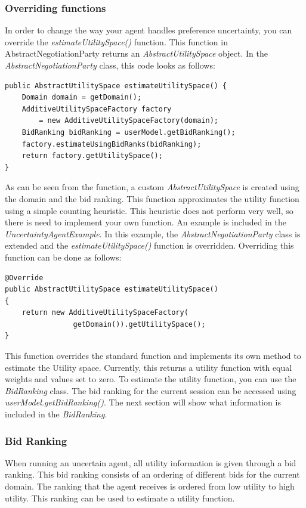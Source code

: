 \documentclass[]{article}
\begin{document}
\subsubsection{Overriding functions}
In order to change the way your agent handles preference uncertainty, you can override the \textit{estimateUtilitySpace()} function. This function in AbstractNegotiationParty returns an \textit{AbstractUtilitySpace} object. In the \textit{AbstractNegotiationParty} class, this code looks as follows:
 \begin{lstlisting}
public AbstractUtilitySpace estimateUtilitySpace() {
	Domain domain = getDomain();
	AdditiveUtilitySpaceFactory factory 
	    = new AdditiveUtilitySpaceFactory(domain);
	BidRanking bidRanking = userModel.getBidRanking();
	factory.estimateUsingBidRanks(bidRanking);
	return factory.getUtilitySpace();
}
\end{lstlisting}

As can be seen from the function, a custom \textit{AbstractUtilitySpace} is created using the domain and the bid ranking. This function approximates the utility function using a simple counting heuristic. This heuristic does not perform very well, so there is need to implement your own function. An example is included in the \textit{UncertaintyAgentExample}. In this example, the \textit{AbstractNegotiationParty} class is extended and the \textit{estimateUtilitySpace()} function is overridden. Overriding this function can be done as follows:
\begin{lstlisting}
@Override
public AbstractUtilitySpace estimateUtilitySpace() 
{
	return new AdditiveUtilitySpaceFactory(
	            getDomain()).getUtilitySpace();
}
\end{lstlisting}

This function overrides the standard function and implements its own method to estimate the Utility space. Currently, this returns a utility function with equal weights and values set to zero. To estimate the utility function, you can use the \textit{BidRanking} class. The bid ranking for the current session can be accessed using \textit{userModel.getBidRanking()}. The next section will show what information is included in the \textit{BidRanking}.

\subsubsection{Bid Ranking}
When running an uncertain agent, all utility information is given through a bid ranking. This bid ranking consists of an ordering of different bids for the current domain. The ranking that the agent receives is ordered from low utility to high utility. This ranking can be used to estimate a utility function. 
\end{document}

